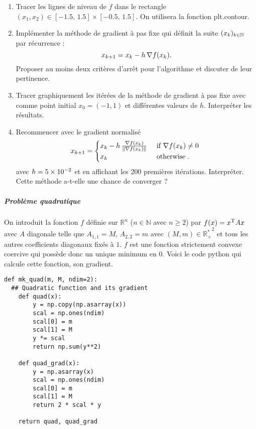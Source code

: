 \documentclass[a4paper,french,12pt]{article}
\begin{document}
\begin{enumerate}
\item Tracer les lignes de niveau de $f$ dans le rectangle 
  $(x_1,x_2)\in [-1.5,\,1.5]\times[-0.5,\, 1.5]$.
  On utilisera la fonction plt.contour.
\item Implémenter la méthode de gradient à pas fixe qui définit la suite $(x_k)_{k \in \mathbb{N}}$ par récurrence :
\[
 x_{k+1} = x_{k} - h \, \nabla f(x_{k}).
\] 
Proposer au moins deux critères d'arrêt pour l'algorithme et  discuter de
leur pertinence.
\item Tracer graphiquement les itérées de la méthode de gradient à pas
  fixe avec comme point initial $x_{0}=(-1,1)$ et différentes valeurs
  de $h$. Interpréter les résultats.
\item  Recommencer avec le gradient normalisé
\[
x_{k+1} = 
\begin{cases}
x_{k} - h \, \frac{\nabla f(x_{k}) }{ \Vert \nabla f(x_{k}) \Vert} & \text{ if  $ \nabla f(x_{k}) \not = 0$ } \\
x_k & \text{ otherwise} \;.
\end{cases}
\]
avec $h = 5 \times 10^{-2}$ et en affichant les 200 premières itérations. 
Interpréter. Cette méthode a-t-elle une chance de converger ? 
\end{enumerate}

\subparagraph{Problème quadratique}
On introduit la fonction $f$ définie sur $\mathbb{R}^n$ ($n \in \mathbb{N}$ avec $n \geq 2$) par $f(x) = x^{\mathrm{T}} A x$ avec $A$ diagonale telle que $A_{1,1} = M$, $A_{2,2} = m$ avec $(M,m) \in {\mathbb{R}_+^*}^2$ et tous les autres coefficients diagonaux fixés à $1$. $f$ est une fonction strictement convexe coercive qui possède donc un unique minimum en $0$. Voici le code python qui calcule cette fonction, son gradient.
\begin{lstlisting}
def mk_quad(m, M, ndim=2):
  ## Quadratic function and its gradient
    def quad(x):
        y = np.copy(np.asarray(x))
        scal = np.ones(ndim)
        scal[0] = m
        scal[1] = M
        y *= scal
        return np.sum(y**2)

    def quad_grad(x):
        y = np.asarray(x)
        scal = np.ones(ndim)
        scal[0] = m
        scal[1] = M
        return 2 * scal * y

    return quad, quad_grad
  \end{lstlisting}
\end{document}
